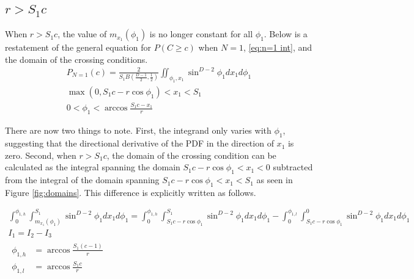 \documentclass{article}
\begin{document}
\subsection{$r>S_1c$} \label{s:long needle}
When $r>S_1c$, the value of $m_{x_1}(\phi_1)$ is no longer constant for all $\phi_1$. Below is a restatement
of the general equation for $P(C\ge c)$ when $N=1$, \ref{eq:n=1 int}, and the domain of the crossing conditions.
\begin{gather*}
	P_{N=1}(c) = \frac{2}{S_1 B(\frac{D-1}{2}, \frac{1}{2})} \iint_{\phi_1, x_1}\sin ^ {D-2}\phi_1 dx_1 d\phi_1 \\
	\max(0, S_1c-r\cos\phi_1) < x_1 < S_1 \\
	0 < \phi_1 < \arccos\frac{S_1c-x_1}{r}
\end{gather*}

There are now two things to note. First, the integrand only varies with $\phi_1$, suggesting that the directional
derivative of the PDF in the direction of $x_1$ is zero. Second, when $r>S_1c$, the domain of the crossing condition
can be calculated as the integral spanning the domain $S_1c-r\cos\phi_1<x_1<0$ subtracted from the integral of
the domain spanning $S_1c-r\cos\phi_1<x_1<S_1$ as seen in Figure \ref{fig:domains}. This difference is explicitly
written as follows.

\begin{gather}
	\int_0^{\phi_{1,h}}\int_{m_{x_1}(\phi_1)}^{S_1}\sin^{D-2}\phi_1dx_1d\phi_1 = \int_0^{\phi_{1,h}}\int_{S_1c-r\cos\phi_1}^{S_1}\sin^{D-2}\phi_1dx_1d\phi_1 - \int_0^{\phi_{1,l}}\int_{S_1c-r\cos\phi_1}^0\sin^{D-2}\phi_1dx_1d\phi_1 \\
	I_1 = I_2 - I_3 \\
	\begin{align}
		\phi_{1,h} &= \arccos\frac{S_1(c-1)}{r} \\
		\phi_{1,l} &= \arccos\frac{S_1c}{r}
	\end{align}
\end{gather}
\end{document}
